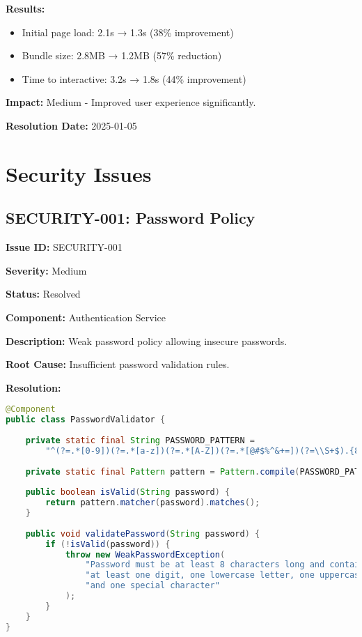 \documentclass[12pt,a4paper]{article}
\begin{document}
\textbf{Results:}
\begin{itemize}
    \item Initial page load: 2.1s → 1.3s (38\% improvement)
    \item Bundle size: 2.8MB → 1.2MB (57\% reduction)
    \item Time to interactive: 3.2s → 1.8s (44\% improvement)
\end{itemize}

\textbf{Impact:} Medium - Improved user experience significantly.

\textbf{Resolution Date:} 2025-01-05

\section{Security Issues}

\subsection{SECURITY-001: Password Policy}

\textbf{Issue ID:} SECURITY-001

\textbf{Severity:} Medium

\textbf{Status:} Resolved

\textbf{Component:} Authentication Service

\textbf{Description:} Weak password policy allowing insecure passwords.

\textbf{Root Cause:} Insufficient password validation rules.

\textbf{Resolution:}
\begin{lstlisting}[language=Java, caption=Strong Password Policy Implementation]
@Component
public class PasswordValidator {
    
    private static final String PASSWORD_PATTERN = 
        "^(?=.*[0-9])(?=.*[a-z])(?=.*[A-Z])(?=.*[@#$%^&+=])(?=\\S+$).{8,}$";
    
    private static final Pattern pattern = Pattern.compile(PASSWORD_PATTERN);
    
    public boolean isValid(String password) {
        return pattern.matcher(password).matches();
    }
    
    public void validatePassword(String password) {
        if (!isValid(password)) {
            throw new WeakPasswordException(
                "Password must be at least 8 characters long and contain " +
                "at least one digit, one lowercase letter, one uppercase letter, " +
                "and one special character"
            );
        }
    }
}
\end{lstlisting}
\end{document}
